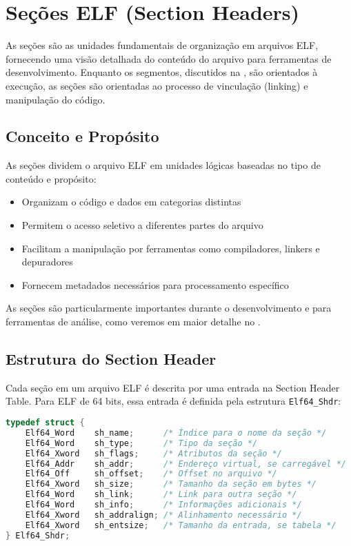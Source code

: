 \section{Seções ELF (Section Headers)}\label{sec:elf_sections}

As seções são as unidades fundamentais de organização em arquivos ELF, fornecendo uma visão detalhada do conteúdo do arquivo para ferramentas de desenvolvimento. Enquanto os segmentos, discutidos na , são orientados à execução, as seções são orientadas ao processo de vinculação (linking) e manipulação do código.

\subsection{Conceito e Propósito}\label{subsec:section_purpose}

As seções dividem o arquivo ELF em unidades lógicas baseadas no tipo de conteúdo e propósito:

\begin{itemize}
    \item Organizam o código e dados em categorias distintas
    \item Permitem o acesso seletivo a diferentes partes do arquivo
    \item Facilitam a manipulação por ferramentas como compiladores, linkers e depuradores
    \item Fornecem metadados necessários para processamento específico
\end{itemize}

As seções são particularmente importantes durante o desenvolvimento e para ferramentas de análise, como veremos em maior detalhe no .

\subsection{Estrutura do Section Header}\label{subsec:section_header_structure}

Cada seção em um arquivo ELF é descrita por uma entrada na Section Header Table. Para ELF de 64 bits, essa entrada é definida pela estrutura \texttt{Elf64\_Shdr}:

\begin{lstlisting}[language=C, caption={Estrutura do Section Header de 64 bits}, label={lst:elf64_shdr}]
typedef struct {
    Elf64_Word    sh_name;      /* Índice para o nome da seção */
    Elf64_Word    sh_type;      /* Tipo da seção */
    Elf64_Xword   sh_flags;     /* Atributos da seção */
    Elf64_Addr    sh_addr;      /* Endereço virtual, se carregável */
    Elf64_Off     sh_offset;    /* Offset no arquivo */
    Elf64_Xword   sh_size;      /* Tamanho da seção em bytes */
    Elf64_Word    sh_link;      /* Link para outra seção */
    Elf64_Word    sh_info;      /* Informações adicionais */
    Elf64_Xword   sh_addralign; /* Alinhamento necessário */
    Elf64_Xword   sh_entsize;   /* Tamanho da entrada, se tabela */
} Elf64_Shdr;
\end{lstlisting}

